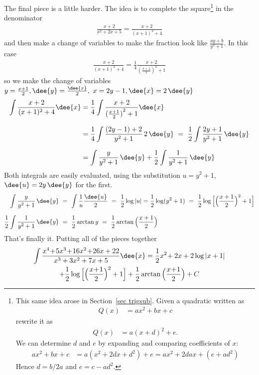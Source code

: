 \begin{eg}
\begin{itemize}
The final piece is a little harder. The idea is to complete the square\footnote{This same
idea arose in Section~\ref{sec trigsub}. Given a quadratic written as
\begin{align*}
  Q(x) &= ax^2+bx+c
\end{align*}
rewrite it as
\begin{align*}
  Q(x) &= a(x+d)^2+e.
\end{align*}
We can determine $d$ and $e$ by expanding and comparing coefficients of $x$:
\begin{align*}
  ax^2+bx+c &= a(x^2+2dx+d^2)+e = ax^2 + 2dax + (e+ad^2)
\end{align*}
Hence $d=b/2a$ and $e=c-ad^2$.} in the denominator
\begin{align*}
\frac{x+2}{x^2+2x+5}= \frac{x+2}{(x+1)^2+4}
\end{align*}
and then make a change of variables to make the fraction look like
$\frac{ay+b}{y^2+1}$. In this case
\begin{align*}
\frac{x+2}{(x+1)^2+4}=\frac{1}{4}\frac{x+2}{(\frac{x+1}{2})^2+1}
\end{align*}
so we make the change of variables $y=\frac{x+1}{2},\dee{y}=\frac{\dee{x}}{2},\
x=2y-1,\dee{x}=2\,\dee{y}$
\begin{align*}
\int \frac{x+2}{(x+1)^2+4}\dee{x}
&=\frac{1}{4}\int \frac{x+2}{{(\frac{x+1}{2})}^2+1}\dee{x} \\[0.1in]
&=\frac{1}{4}\int \frac{(2y-1)+2}{y^2+1}\,2\,\dee{y}
\ =\ \frac{1}{2}\int \frac{2y+1}{y^2+1}\,\dee{y}\\[0.1in]
&=\int \frac{y}{y^2+1}\,\dee{y} + \frac{1}{2}\int \frac{1}{y^2+1}\,\dee{y}
\end{align*}
Both integrals are easily evaluated, using the substitution $u=y^2+1$,
$\dee{u}=2y\,\dee{y}$ for the first.
\begin{align*}
\int \frac{y}{y^2+1}\,\dee{y}
&\ =\ \int \frac{1}{u}\frac{\dee{u}}{2}
\ =\ \frac{1}{2}\log|u|=\frac{1}{2}\log(y^2+1)
\ =\ \frac{1}{2}\log\Big[\Big(\frac{x+1}{2}\Big)^2+1\Big]\\[0.1in]
\frac{1}{2}\int \frac{1}{y^2+1}\,\dee{y}
&\ =\ \frac{1}{2}\arctan y
\ =\ \frac{1}{2}\arctan\Big(\frac{x+1}{2}\Big)
\end{align*}
That's finally it. Putting all of the pieces together
\begin{multline*}
\int\frac{x^4\!+\!5x^3\!+\!16x^2\!+\!26x+22}{x^3+3x^2+7x+5}\dee{x}
=\frac{1}{2} x^2\!+2x+2\log|x+1| \\
       +\frac{1}{2}\log\Big[\Big(\frac{x\!+\!1}{2}\Big)^2+1\Big]
+\frac{1}{2}\arctan\Big(\frac{x\!+\!1}{2}\Big)+C
\end{multline*}
\end{itemize}
\end{eg}


